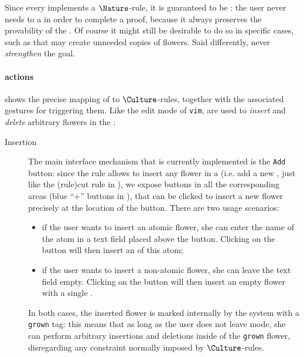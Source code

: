 \begin{scope}
Since every   implements a $\Nature$-rule, it is guaranteed
to be \emph{}: the user never needs to  a 
 in order to complete a proof, because it always preserves the
provability of the . Of course it might still be desirable to do so in
specific cases, such as   that may create unneeded copies
of flowers. Said differently,   never \emph{strengthen} the
goal.

\paragraph{ actions}

 shows the precise mapping of   to
$\Culture$-rules, together with the associated gestures for triggering them.
Like the edit mode of \texttt{vim},   are used to \emph{insert} and
\emph{delete} arbitrary flowers in the :
\begin{description}
  \item[Insertion] The main interface mechanism that is currently
  implemented is the \texttt{Add} button: since the  rule allows to
  insert any flower in a   (i.e. add a new , just like the
  \kl(rule){cut} rule in ), we expose buttons in all the corresponding
  areas (blue ``+'' buttons in ), that can be
  clicked to insert a new flower precisely at the location of the button. There
  are two usage scenarios:
  \begin{itemize}
    \item if the user wants to insert an atomic flower, she can enter the name
    of the atom in a text field placed above the button. Clicking on the button
    will then insert an  of this atom;
    \item if the user wants to insert a non-atomic flower, she can leave the
    text field empty. Clicking on the button will then insert an empty flower
    with a single .
  \end{itemize}
  In both cases, the inserted flower is marked internally by the system with a
  \texttt{grown} tag: this means that as long as the user does not leave
   mode, she can perform arbitrary insertions and deletions inside of
  the \texttt{grown} flower, disregarding any  constraint normally
  imposed by $\Culture$-rules.
  

\end{description}
\end{scope}
